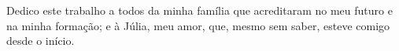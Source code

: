 Dedico este trabalho a todos da minha família que acreditaram no meu futuro e na minha formação; e à Júlia, meu amor, que, mesmo sem saber, esteve comigo desde o início.